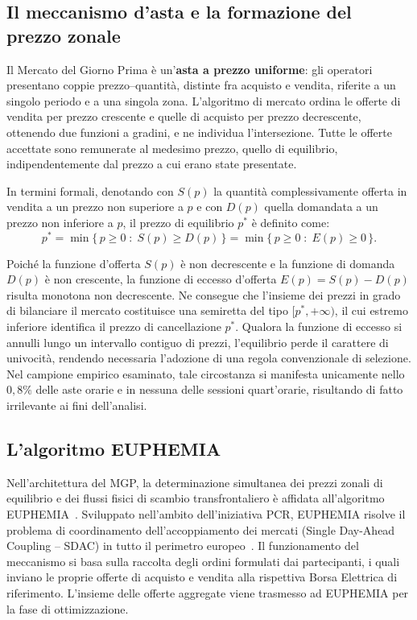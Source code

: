 \subsection{Il meccanismo d'asta e la formazione del prezzo zonale}

Il Mercato del Giorno Prima è un'\textbf{asta a prezzo uniforme}: gli operatori presentano coppie prezzo--quantità, distinte fra acquisto e vendita, riferite a un singolo periodo e a una singola zona. L'algoritmo di mercato ordina le offerte di vendita per prezzo crescente e quelle di acquisto per prezzo decrescente, ottenendo due funzioni a gradini, e ne individua
l'intersezione. Tutte le offerte accettate sono remunerate al medesimo prezzo, quello di equilibrio, indipendentemente dal prezzo a cui erano state presentate.

In termini formali, denotando con $S(p)$ la quantità complessivamente offerta in vendita a un prezzo non superiore a $p$ e con $D(p)$ quella domandata a un prezzo non inferiore a $p$, il prezzo di equilibrio $p^*$ è definito come:
\begin{equation}
p^* = \min \{\, p \ge 0 \;:\; S(p) \ge D(p) \,\} = \min \{\, p \ge 0 \;:\; E(p) \ge 0 \,\}.
\label{eq:clearing}
\end{equation}

Poiché la funzione d'offerta $S(p)$ è non decrescente e la funzione di domanda $D(p)$ è non crescente, la funzione di eccesso d'offerta $E(p) = S(p) - D(p)$ risulta monotona non decrescente. Ne consegue che l'insieme dei prezzi in grado di bilanciare il mercato costituisce una semiretta del tipo $[p^*, +\infty)$, il cui estremo inferiore identifica il prezzo di cancellazione $p^*$. Qualora la funzione di eccesso si annulli lungo un intervallo contiguo di prezzi, l'equilibrio perde il carattere di univocità, rendendo necessaria l'adozione di una regola convenzionale di selezione. Nel campione empirico esaminato, tale circostanza si manifesta unicamente nello $0{,}8\%$ delle aste orarie e in nessuna delle sessioni quart'orarie, risultando di fatto irrilevante ai fini dell'analisi.



\subsection{L'algoritmo \textsf{E{\small UPHEMIA}}}
\label{sec:euphemia}

Nell'architettura del \ac{MGP}, la determinazione simultanea dei prezzi zonali di equilibrio e dei flussi fisici di scambio transfrontaliero è affidata all'algoritmo \textsf{E{\small UPHEMIA}}~\cite{alberizzi_rse_2025, nemo_euphemia}. Sviluppato nell'ambito dell'iniziativa \acf{PCR}, \textsf{E{\small UPHEMIA}} risolve il problema di coordinamento dell'accoppiamento dei mercati (Single Day-Ahead Coupling -- SDAC) in tutto il perimetro europeo~\cite{alberizzi_rse_2025}. Il funzionamento del meccanismo si basa sulla raccolta degli ordini formulati dai partecipanti, i quali inviano le proprie offerte di acquisto e vendita alla rispettiva Borsa Elettrica di riferimento. L'insieme delle offerte aggregate viene trasmesso ad \textsf{E{\small UPHEMIA}} per la fase di ottimizzazione.


